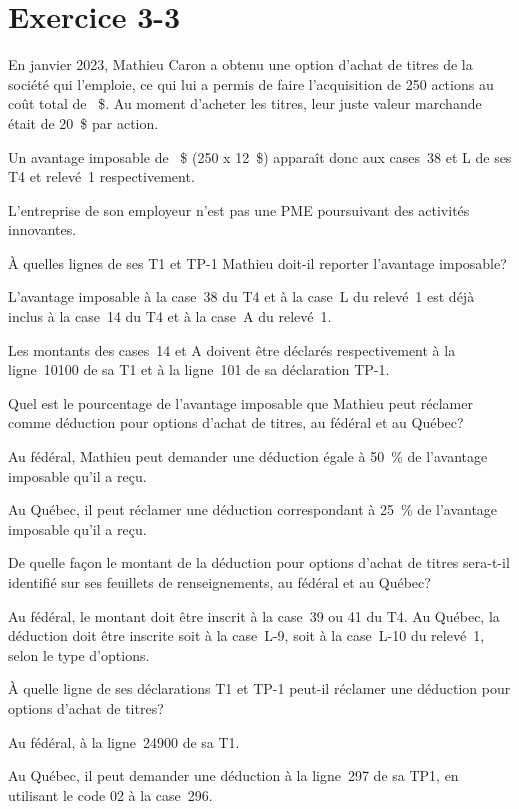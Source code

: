 \section{Exercice 3-3}
\setcounter{question}{0}
\begin{question}
	En janvier 2023, Mathieu Caron a obtenu une option d'achat de titres de la société qui l'emploie, ce qui lui a permis de faire l'acquisition de 250 actions au coût total de ~\$. Au moment d'acheter les titres, leur juste valeur marchande était de 20~\$ par action. 
	
	Un avantage imposable de ~\$ (250 x 12~\$) apparaît donc aux cases~38 et L de ses T4 et relevé~1 respectivement. 
	
	L'entreprise de son employeur n'est pas une PME poursuivant des activités innovantes. 
\end{question}
\setcounter{sousQuestion}{0}
\begin{sousQuestion}
	À quelles lignes de ses T1 et TP-1 Mathieu doit-il reporter l'avantage imposable?
\end{sousQuestion}
L'avantage imposable à la case~38 du T4 et à la case~L du relevé~1 est déjà inclus à la case~14 du T4 et à la case~A du relevé~1.

Les montants des cases~14 et A doivent être déclarés respectivement à la ligne~10100 de sa T1 et à la ligne~101 de sa déclaration TP-1.

\begin{sousQuestion}
	Quel est le pourcentage de l'avantage imposable que Mathieu peut réclamer comme déduction pour options d'achat de titres, au fédéral et au Québec?
\end{sousQuestion}
Au fédéral, Mathieu peut demander une déduction égale à 50~\% de l'avantage imposable qu'il a reçu.

Au Québec, il peut réclamer une déduction correspondant à 25~\% de l'avantage imposable qu'il a reçu.

\begin{sousQuestion}
	De quelle façon le montant de la déduction pour options d'achat de titres sera-t-il identifié sur ses feuillets de renseignements, au fédéral et au Québec?
\end{sousQuestion}
Au fédéral, le montant doit être inscrit à la case~39 ou 41 du T4. Au Québec, la déduction doit être inscrite soit à la case~L-9, soit à la case~L-10 du relevé~1, selon le type d'options. 

\begin{sousQuestion}
	À quelle ligne de ses déclarations T1 et TP-1 peut-il réclamer une déduction pour options d'achat de titres?
\end{sousQuestion}
Au fédéral, à la ligne~24900 de sa T1.

Au Québec, il peut demander une déduction à la ligne~297 de sa TP1, en utilisant le code 02 à la case~296.
